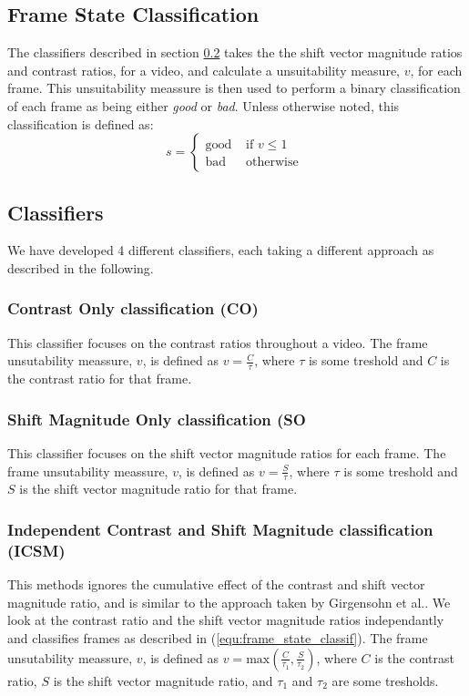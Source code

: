 \subsection{Frame State Classification}
%
The classifiers described in section \ref{sec:algorithms} takes the the shift vector magnitude ratios and contrast ratios, for a video, and calculate a unsuitability measure, $v$, for each frame. This unsuitability meassure is then used to perform a binary classification of each frame as being either \textit{good} or \textit{bad}. Unless otherwise noted, this classification is defined as:
\begin{equation}
s = 
\begin{cases}
\text{good} & \text{ if } v \leq 1\\
\text{bad} & \text{ otherwise }
\end{cases}
\end{equation}\label{equ:frame_state_classif}
%
\subsection{Classifiers}\label{sec:algorithms}
%
We have developed 4 different classifiers, each taking a different approach as described in the following.
%
\subsubsection{Contrast Only classification (CO)}
%
This classifier focuses on the contrast ratios throughout a video. The frame unsutability meassure, $v$, is defined as $v=\frac{C}{\tau}$, where $\tau$ is some treshold and $C$ is the contrast ratio for that frame.
%
\subsubsection{Shift Magnitude Only classification (SO}
%
This classifier focuses on the shift vector magnitude ratios for each frame. The frame unsutability meassure, $v$, is defined as $v=\frac{S}{\tau}$, where $\tau$ is some treshold and $S$ is the shift vector magnitude ratio for that frame.
%
\subsubsection{Independent Contrast and Shift Magnitude classification (ICSM)}
%
This methods ignores the cumulative effect of the contrast and shift vector magnitude ratio, and is similar to the approach taken by Girgensohn et al.\cite{Girgensohn:2000:SAH:354401.354415}. We look at the contrast ratio and the shift vector magnitude ratios independantly and classifies frames as described in (\ref{equ:frame_state_classif}). The frame unsutability meassure, $v$, is defined as $v=\text{max}(\frac{C}{\tau_1}, \frac{S}{\tau_2})$, where $C$ is the contrast ratio, $S$ is the shift vector magnitude ratio, and $\tau_1$ and $\tau_2$ are some tresholds.
%

